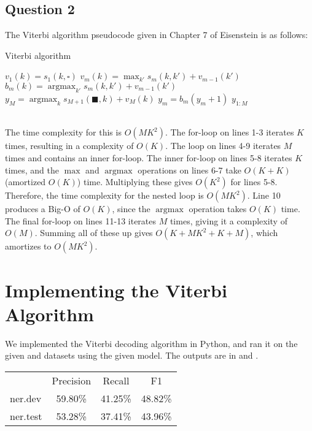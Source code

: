 \documentclass[12pt,notitlepage]{article}
\DeclareMathOperator*{\argmax}{argmax}
\begin{document}
\subsection*{Question 2}
The Viterbi algorithm pseudocode given in Chapter 7 of Eisenstein is as follows: 
\begin{algorithm}
	\caption{Viterbi algorithm}
\begin{algorithmic}[1]
	\STATE $v_1(k)=s_1(k,\square)$
	\ENDFOR
	\STATE $v_m(k) = \max_{k'}s_m(k,k') + v_{m-1}(k')$\\
	\STATE $b_m(k) = \argmax_{k'}s_m(k,k') + v_{m-1}(k')$
	\ENDFOR
	\ENDFOR
	\STATE $y_M = \argmax_{k}s_{M+1}(\blacksquare,k) + v_M(k)$
	\STATE $y_m = b_m(y_m+1)$
	\ENDFOR
	\RETURN $y_{1:M}$
\end{algorithmic}
\end{algorithm} \\
The time complexity for this is $O(MK^2)$. The for-loop on lines 1-3 iterates $K$ times, resulting in a complexity of $O(K)$. The loop on lines 4-9 iterates $M$ times and contains an inner for-loop. The inner for-loop on lines 5-8 iterates $K$ times, and the $\max$ and $\argmax$ operations on lines 6-7 take $O(K+K)$ (amortized $O(K)$) time. Multiplying these gives $O(K^2)$ for lines 5-8. Therefore, the time complexity for the nested loop is $O(MK^2)$. Line 10 produces a Big-O of $O(K)$, since the $\argmax$ operation takes $O(K)$ time. The final for-loop on lines 11-13 iterates $M$ times, giving it a complexity of $O(M)$. Summing all of these up gives $O(K + MK^2 + K + M)$, which amortizes to $O(MK^2)$.

\newpage

\section{Implementing the Viterbi Algorithm}
We implemented the Viterbi decoding algorithm in Python, and ran it on the given  and  datasets using the given model. The outputs are in  and .

\begin{table}[H]
\begin{center}
	\begin{tabular}{lccc}
		\multicolumn{1}{l}{}
		& \multicolumn{1}{c}{Precision}
		& \multicolumn{1}{c}{Recall}
		& \multicolumn{1}{c}{F1} \\
		\cline{2-4}
		\multicolumn{1}{l}{ner.dev}
		& \multicolumn{1}{|c}{59.80\%}
		& \multicolumn{1}{|c}{41.25\%}
		& \multicolumn{1}{|c|}{48.82\%} \\
		\cline{2-4}
		\multicolumn{1}{l}{ner.test}
		& \multicolumn{1}{|c}{53.28\%}
		& \multicolumn{1}{|c}{37.41\%}
		& \multicolumn{1}{|c|}{43.96\%} \\
		\cline{2-4}
	\end{tabular}
\end{center}
\end{table}
\end{document}

